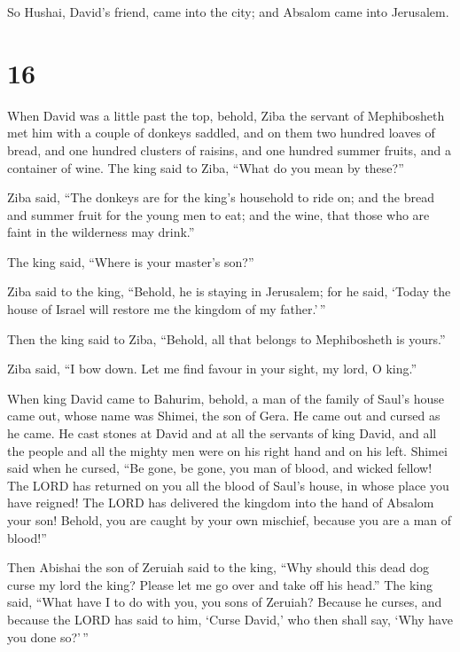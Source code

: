  So Hushai, David's friend, came into the city; and Absalom
came into Jerusalem.

\hypertarget{section-15}{%
\section{16}\label{section-15}}

 When David was a little past the top, behold, Ziba the
servant of Mephibosheth met him with a couple of donkeys saddled, and on
them two hundred loaves of bread, and one hundred clusters of raisins,
and one hundred summer fruits, and a container of wine.  The
king said to Ziba, ``What do you mean by these?''

Ziba said, ``The donkeys are for the king's household to ride on; and
the bread and summer fruit for the young men to eat; and the wine, that
those who are faint in the wilderness may drink.''

 The king said, ``Where is your master's son?''

Ziba said to the king, ``Behold, he is staying in Jerusalem; for he
said, `Today the house of Israel will restore me the kingdom of my
father.'\,''

 Then the king said to Ziba, ``Behold, all that belongs to
Mephibosheth is yours.''

Ziba said, ``I bow down. Let me find favour in your sight, my lord, O
king.''

 When king David came to Bahurim, behold, a man of the
family of Saul's house came out, whose name was Shimei, the son of Gera.
He came out and cursed as he came.  He cast stones at David
and at all the servants of king David, and all the people and all the
mighty men were on his right hand and on his left.  Shimei
said when he cursed, ``Be gone, be gone, you man of blood, and wicked
fellow!  The LORD has returned on you all the blood of
Saul's house, in whose place you have reigned! The LORD has delivered
the kingdom into the hand of Absalom your son! Behold, you are caught by
your own mischief, because you are a man of blood!''

 Then Abishai the son of Zeruiah said to the king, ``Why
should this dead dog curse my lord the king? Please let me go over and
take off his head.''  The king said, ``What have I to do
with you, you sons of Zeruiah? Because he curses, and because the LORD
has said to him, `Curse David,' who then shall say, `Why have you done
so?'\,''

